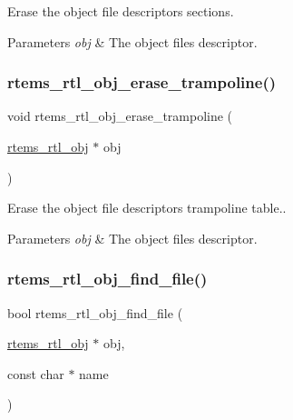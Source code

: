 Erase the object file descriptor\textquotesingle{}s sections.


\begin{DoxyParams}{Parameters}
{\em obj} & The object file\textquotesingle{}s descriptor. \\
\hline
\end{DoxyParams}
\mbox{\label{rtl-obj_8h_a59b26b41ab6dacfe609d8c98c36e535a}} 
\subsubsection{\texorpdfstring{rtems\_rtl\_obj\_erase\_trampoline()}{rtems\_rtl\_obj\_erase\_trampoline()}}
{\footnotesize\ttfamily void rtems\+\_\+rtl\+\_\+obj\+\_\+erase\+\_\+trampoline (\begin{DoxyParamCaption}\item[{\mbox{\hyperlink{structrtems__rtl__obj}{rtems\+\_\+rtl\+\_\+obj}} $\ast$}]{obj }\end{DoxyParamCaption})}

Erase the object file descriptor\textquotesingle{}s trampoline table..


\begin{DoxyParams}{Parameters}
{\em obj} & The object file\textquotesingle{}s descriptor. \\
\hline
\end{DoxyParams}
\mbox{\label{rtl-obj_8h_a01178159b33ae5e8a94b77f5f2fd6aa9}} 
\subsubsection{\texorpdfstring{rtems\_rtl\_obj\_find\_file()}{rtems\_rtl\_obj\_find\_file()}}
{\footnotesize\ttfamily bool rtems\+\_\+rtl\+\_\+obj\+\_\+find\+\_\+file (\begin{DoxyParamCaption}\item[{\mbox{\hyperlink{structrtems__rtl__obj}{rtems\+\_\+rtl\+\_\+obj}} $\ast$}]{obj,  }\item[{const char $\ast$}]{name }\end{DoxyParamCaption})}

